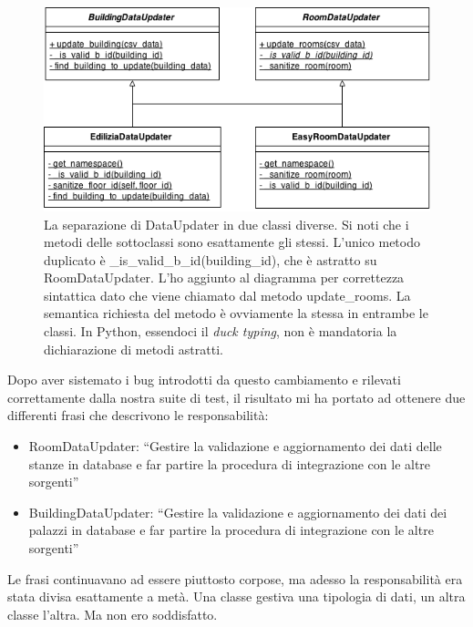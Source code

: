 \documentclass[12pt]{report}
\begin{document}
\begin{figure}[H]
    \centering
    \includegraphics[width=340pt,natwidth=534,natheight=282]{class_diagram_dataupdater_after.png}
    \caption{La separazione di DataUpdater in due classi diverse. Si noti
    che i metodi delle sottoclassi sono esattamente gli stessi. L'unico metodo
    duplicato è \_is\_valid\_b\_id(building\_id), che è astratto
    su RoomDataUpdater. L'ho aggiunto al diagramma per correttezza 
    sintattica dato che viene chiamato dal metodo update\_rooms. La semantica
    richiesta del metodo è ovviamente la stessa in entrambe le classi.
    In Python, essendoci il \textit{duck typing}, non è mandatoria la
    dichiarazione di metodi astratti. 
    }
    \label{fig:class_diagram_dataupdater_after}
\end{figure}

Dopo aver sistemato i bug introdotti da questo cambiamento e rilevati 
correttamente dalla nostra suite di test, il risultato mi ha portato ad
ottenere due differenti frasi che descrivono le responsabilità:

\begin{itemize}
  \item RoomDataUpdater: ``Gestire la validazione e aggiornamento dei dati delle
  stanze in database e far partire la procedura di integrazione
con le altre sorgenti''
  \item BuildingDataUpdater: ``Gestire la validazione e aggiornamento dei dati 
  dei palazzi in database e far partire la procedura di integrazione
con le altre sorgenti''
\end{itemize}

Le frasi continuavano ad essere piuttosto corpose, ma adesso la responsabilità 
era stata divisa esattamente a metà. Una classe gestiva una tipologia di 
dati, un altra classe l'altra. Ma non ero soddisfatto. 
\end{document}
